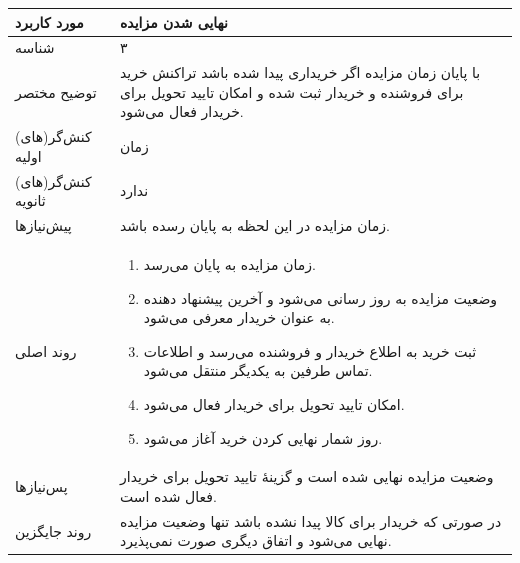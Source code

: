 \documentclass{article}
\begin{document}
\begin{center}
\bgroup
\def\arraystretch{1.5}
\begin{tabular} {|p{}|p{}|}
\hline
 مورد کاربرد & 
نهایی شدن مزایده
\\ \hline
 شناسه &
۳
\\ \hline
توضیح مختصر &
با پایان زمان مزایده اگر خریداری پیدا شده باشد تراکنش خرید برای فروشنده و خریدار ثبت شده و امکان تایید تحویل برای خریدار فعال می‌شود.
\\ \hline
کنش‌گر(های) اولیه &
زمان
\\ \hline
کنش‌گر(های) ثانویه &
ندارد
\\ \hline
پیش‌نیازها &
زمان مزایده در این لحظه به پایان رسده باشد.
\\ \hline
روند اصلی &
\begin{enumerate}[nosep,topsep=0cm]
\item
زمان مزایده به پایان می‌رسد.
\item
وضعیت مزایده به روز رسانی می‌شود و آخرین پیشنهاد دهنده به عنوان خریدار معرفی می‌شود.
\item
ثبت خرید به اطلاع خریدار و فروشنده می‌رسد و اطلاعات تماس طرفین به یکدیگر منتقل می‌شود.
\item
امکان تایید تحویل برای خریدار فعال می‌شود.
\item
روز شمار نهایی کردن خرید آغاز می‌شود.
\end{enumerate}
\\ \hline
پس‌نیازها &
وضعیت مزایده نهایی شده است و گزینهٔ تایید تحویل برای خریدار فعال شده است.
\\ \hline
روند جایگزین &
در صورتی که خریدار برای کالا پیدا نشده باشد تنها وضعیت مزایده نهایی می‌شود و اتفاق دیگری صورت نمی‌پذیرد.
\\ \hline
\end{tabular}
\egroup
\end{center}

\newpage
\end{document}

